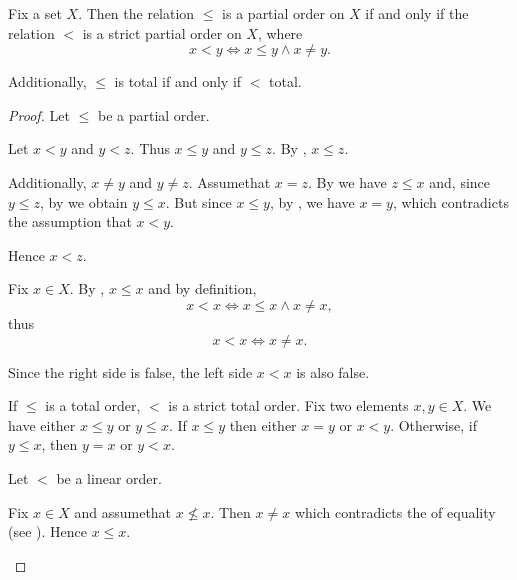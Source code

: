 \begin{proposition}\label{thm:strict_partial_order_conversion}
  Fix a set \( X \). Then the relation \( \leq \) is a partial order on \( X \) if and only if the relation \( < \) is a strict partial order on \( X \), where
  \begin{equation*}
    x < y \iff x \leq y \land x \neq y.
  \end{equation*}

  Additionally, \( \leq \) is total if and only if \( < \) total.
\end{proposition}
\begin{proof}
  \Implies Let \( \leq \) be a partial order.
  \begin{description}
     Let \( x < y \) and \( y < z \). Thus \( x \leq y \) and \( y \leq z \). By , \( x \leq z \).

    Additionally, \( x \neq y \) and \( y \neq z \). Assume\LEM that \( x = z \). By  we have \( z \leq x \) and, since \( y \leq z \), by  we obtain \( y \leq x \). But since \( x \leq y \), by , we have \( x = y \), which contradicts the assumption that \( x < y \).

    Hence \( x < z \).

     Fix \( x \in X \). By , \( x \leq x \) and by definition,
    \begin{equation*}
      x < x \iff x \leq x \land x \neq x,
    \end{equation*}
    thus
    \begin{equation*}
      x < x \iff x \neq x.
    \end{equation*}

    Since the right side is false, the left side \( x < x \) is also false.

     If \( \leq \) is a total order, \( < \) is a strict total order. Fix two elements \( x, y \in X \). We have either \( x \leq y \) or \( y \leq x \). If \( x \leq y \) then either \( x = y \) or \( x < y \). Otherwise, if \( y \leq x \), then \( y = x \) or \( y < x \).
  \end{description}

  \ImpliedBy Let \( < \) be a linear order.
  \begin{description}
     Fix \( x \in X \) and assume\LEM that \( x \not\leq x \). Then \( x \neq x \) which contradicts the  of equality (see ). Hence \( x \leq x \).


\end{description}
\end{proof}
